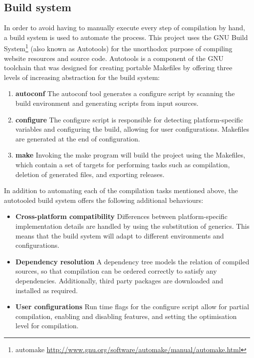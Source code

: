\subsection{Build system}\label{subsec:build-system}

In order to avoid having to manually execute every step of compilation
by hand, a build system is used to automate the process. This project
uses the GNU Build System\footnote{automake
  \url{http://www.gnu.org/software/automake/manual/automake.html}}
(also known as Autotools) for the unorthodox purpose of compiling
website resources and source code. Autotools is a component of the GNU
toolchain that was designed for creating portable Makefiles by
offering three levels of increasing abstraction for the build system:

\begin{enumerate}
\item \textbf{autoconf} The autoconf tool generates a configure script
  by scanning the build environment and generating scripts from input
  sources.
\item \textbf{configure} The configure script is responsible for
  detecting platform-specific variables and configuring the build,
  allowing for user configurations. Makefiles are generated at the end
  of configuration.
\item \textbf{make} Invoking the make program will build the project
  using the Makefiles, which contain a set of targets for performing
  tasks such as compilation, deletion of generated files, and
  exporting releases.
\end{enumerate}

In addition to automating each of the compilation tasks mentioned
above, the autotooled build system offers the following additional
behaviours:

\begin{itemize}
\item \textbf{Cross-platform compatibility} Differences between
  platform-specific implementation details are handled by using the
  substitution of generics. This means that the build system will
  adapt to different environments and configurations.
\item \textbf{Dependency resolution} A dependency tree models the
  relation of compiled sources, so that compilation can be ordered
  correctly to satisfy any dependencies. Additionally, third party
  packages are downloaded and installed as required.
\item \textbf{User configurations} Run time flags for the configure
  script allow for partial compilation, enabling and disabling
  features, and setting the optimisation level for compilation.
\end{itemize}

